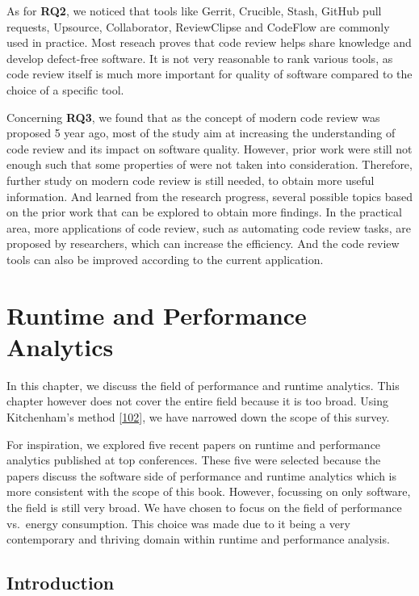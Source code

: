 \documentclass[]{book}
\begin{document}
As for \textbf{RQ2}, we noticed that tools like Gerrit, Crucible, Stash,
GitHub pull requests, Upsource, Collaborator, ReviewClipse and CodeFlow
are commonly used in practice. Most reseach proves that code review
helps share knowledge and develop defect-free software. It is not very
reasonable to rank various tools, as code review itself is much more
important for quality of software compared to the choice of a specific
tool.

Concerning \textbf{RQ3}, we found that as the concept of modern code
review was proposed 5 year ago, most of the study aim at increasing the
understanding of code review and its impact on software quality.
However, prior work were still not enough such that some properties of
were not taken into consideration. Therefore, further study on modern
code review is still needed, to obtain more useful information. And
learned from the research progress, several possible topics based on the
prior work that can be explored to obtain more findings. In the
practical area, more applications of code review, such as automating
code review tasks, are proposed by researchers, which can increase the
efficiency. And the code review tools can also be improved according to
the current application.

\chapter{Runtime and Performance
Analytics}\label{runtime-and-performance-analytics}

In this chapter, we discuss the field of performance and runtime
analytics. This chapter however does not cover the entire field because
it is too broad. Using Kitchenham's method
{[}\protect\hyperlink{ref-kitchenham2004procedures}{102}{]}, we have
narrowed down the scope of this survey.

For inspiration, we explored five recent papers on runtime and
performance analytics published at top conferences. These five were
selected because the papers discuss the software side of performance and
runtime analytics which is more consistent with the scope of this book.
However, focussing on only software, the field is still very broad. We
have chosen to focus on the field of performance vs.~energy consumption.
This choice was made due to it being a very contemporary and thriving
domain within runtime and performance analysis.

\section{Introduction}\label{introduction-1}
\end{document}

